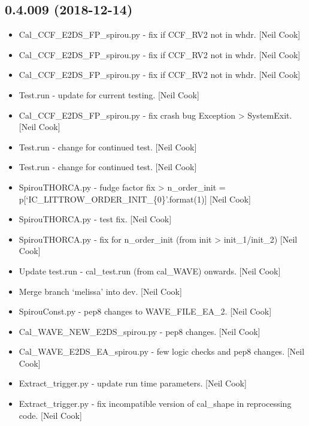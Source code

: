 \documentclass[a4paper,10pt,english]{report}
\begin{document}
\subsection{0.4.009 (2018-12-14)}
\label{\detokenize{misc/changelog:id231}}\begin{itemize}
\item {} 
Cal\_CCF\_E2DS\_FP\_spirou.py - fix if CCF\_RV2 not in whdr. {[}Neil Cook{]}

\item {} 
Cal\_CCF\_E2DS\_FP\_spirou.py - fix if CCF\_RV2 not in whdr. {[}Neil Cook{]}

\item {} 
Cal\_CCF\_E2DS\_FP\_spirou.py - fix if CCF\_RV2 not in whdr. {[}Neil Cook{]}

\item {} 
Test.run - update for current testing. {[}Neil Cook{]}

\item {} 
Cal\_CCF\_E2DS\_FP\_spirou.py - fix crash bug Exception \textendash{}\textgreater{} SystemExit.
{[}Neil Cook{]}

\item {} 
Test.run - change for continued test. {[}Neil Cook{]}

\item {} 
Test.run - change for continued test. {[}Neil Cook{]}

\item {} 
SpirouTHORCA.py - fudge factor fix \textendash{}\textgreater{} n\_order\_init =
p{[}‘IC\_LITTROW\_ORDER\_INIT\_\{0\}’.format(1){]} {[}Neil Cook{]}

\item {} 
SpirouTHORCA.py - test fix. {[}Neil Cook{]}

\item {} 
SpirouTHORCA.py - fix for n\_order\_init (from init \textendash{}\textgreater{} init\_1/init\_2)
{[}Neil Cook{]}

\item {} 
Update test.run - cal\_test.run (from cal\_WAVE) onwards. {[}Neil Cook{]}

\item {} 
Merge branch ‘melissa’ into dev. {[}Neil Cook{]}

\item {} 
SpirouConst.py - pep8 changes to WAVE\_FILE\_EA\_2. {[}Neil Cook{]}

\item {} 
Cal\_WAVE\_NEW\_E2DS\_spirou.py - pep8 changes. {[}Neil Cook{]}

\item {} 
Cal\_WAVE\_E2DS\_EA\_spirou.py - few logic checks and pep8 changes. {[}Neil
Cook{]}

\item {} 
Extract\_trigger.py - update run time parameters. {[}Neil Cook{]}

\item {} 
Extract\_trigger.py - fix incompatible version of cal\_shape in
reprocessing code. {[}Neil Cook{]}

\end{itemize}
\end{document}
